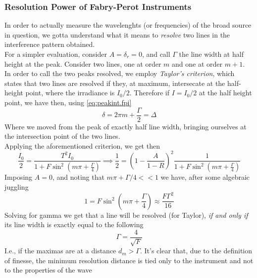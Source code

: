 \documentclass[../electromagnetism.tex]{subfiles}
\begin{document}
\subsubsection{Resolution Power of Fabry-Perot Instruments}
In order to actually measure the wavelenghts (or frequencies) of the broad source in question, we gotta understand what it means to \textit{resolve} two lines in the interference pattern obtained.\\
For a simpler evaluation, consider $A=\delta_r=0$, and call $\Gamma$ the line width at half height at the peak. Consider two lines, one at order $m$ and one at order $m+1$.\\
In order to call the two peaks resolved, we employ \textit{Taylor's criterion}, which states that two lines are resolved if they, at maximum, intersecate at the half-height point, where the irradiance is $I_0/2$. Therefore if $I=I_0/2$ at the half height point, we have then, using \eqref{eq:peakint.fpi}
\begin{equation*}
	\delta=2\pi m+\frac{\Gamma}{2}=\Delta
\end{equation*}
Where we moved from the peak of exactly half line width, bringing ourselves at the intersection point of the two lines.\\
Applying the aforementioned criterion, we get then
\begin{equation*}
	\frac{I_0}{2}=\frac{T^2I_0}{1+F\sin^2\left( m\pi+\frac{\Gamma}{4} \right)}\implies\frac{1}{2}=\left( 1-\frac{A}{1-R} \right)^2\frac{1}{1+F\sin^2\left( m\pi+\frac{\Gamma}{4} \right)}
\end{equation*}
Imposing $A=0$, and noting that $m\pi+\Gamma/4<<1$ we have, after some algebraic juggling
\begin{equation*}
	1=F\sin^2\left( m\pi+\frac{\Gamma}{4} \right)\approx \frac{F\Gamma^2}{16}
\end{equation*}
Solving for gamma we get that a line will be resolved (for Taylor), \textit{if and only if} its line width is exactly equal to the following
\begin{equation}
	\Gamma=\frac{4}{\sqrt{F}}
	\label{eq:linewidthres.fpi}
\end{equation}
I.e., if the maximas are at a distance $d_m>\Gamma$. It's clear that, due to the definition of finesse, the minimum resolution distance is tied only to the instrument and not to the properties of the wave
\end{document}
